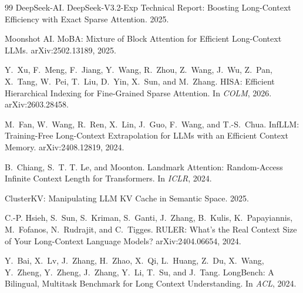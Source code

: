 \documentclass[11pt]{article}
\begin{document}
\begin{thebibliography}{99}
DeepSeek-AI. DeepSeek-V3.2-Exp Technical Report: Boosting Long-Context Efficiency with Exact Sparse Attention. 2025.

Moonshot AI. MoBA: Mixture of Block Attention for Efficient Long-Context LLMs. arXiv:2502.13189, 2025.

Y.~Xu, F.~Meng, F.~Jiang, Y.~Wang, R.~Zhou, Z.~Wang, J.~Wu, Z.~Pan, X.~Tang, W.~Pei, T.~Liu, D.~Yin, X.~Sun, and M.~Zhang. HISA: Efficient Hierarchical Indexing for Fine-Grained Sparse Attention. In \emph{COLM}, 2026. arXiv:2603.28458.

M.~Fan, W.~Wang, R.~Ren, X.~Lin, J.~Guo, F.~Wang, and T.-S.~Chua. InfLLM: Training-Free Long-Context Extrapolation for LLMs with an Efficient Context Memory. arXiv:2408.12819, 2024.

B.~Chiang, S.~T. T. Le, and Moonton. Landmark Attention: Random-Access Infinite Context Length for Transformers. In \emph{ICLR}, 2024.

ClusterKV: Manipulating LLM KV Cache in Semantic Space. 2025.

C.-P. Hsieh, S.~Sun, S.~Kriman, S.~Ganti, J.~Zhang, B.~Kulis, K.~Papayiannis, M.~Fofanos, N.~Rudrajit, and C.~Tigges. RULER: What's the Real Context Size of Your Long-Context Language Models? arXiv:2404.06654, 2024.

Y.~Bai, X.~Lv, J.~Zhang, H.~Zhao, X.~Qi, L.~Huang, Z.~Du, X.~Wang, Y.~Zheng, Y.~Zheng, J.~Zhang, Y.~Li, T.~Su, and J.~Tang. LongBench: A Bilingual, Multitask Benchmark for Long Context Understanding. In \emph{ACL}, 2024.

\end{thebibliography}
\end{document}
